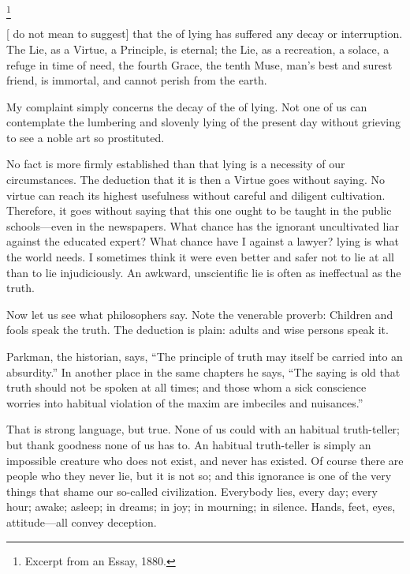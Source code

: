 \documentclass[../../demo.tex]{novelettesubdoc}
\begin{document}
\begin{upperpage}
\null
{}
\footnote{Excerpt from an Essay, 1880.}
\end{upperpage}

[ do not mean to suggest] that the  of lying has
suffered any decay or interruption. The Lie, as a Virtue, a
Principle, is eternal; the Lie, as a recreation, a solace, a refuge in
time of need, the fourth Grace, the tenth Muse, man's best and surest
friend, is immortal, and cannot perish from the earth.

My complaint simply concerns the decay of the  of lying.
Not one of us can contemplate the lumbering and slovenly lying of the
present day without grieving to see a noble art so prostituted.

No fact is more firmly established than that lying is a necessity of our
circumstances. The deduction that it is then a Virtue goes without
saying. No virtue can reach its highest usefulness without careful and
diligent cultivation. Therefore, it goes without saying that this one
ought to be taught in the public schools---even in the newspapers. What
chance has the ignorant uncultivated liar against the educated expert?
What chance have I against a lawyer?  lying
is what the world needs. I sometimes think it were even better and safer
not to lie at all than to lie injudiciously. An awkward, unscientific
lie is often as ineffectual as the truth.

Now let us see what philosophers say. Note the venerable proverb:
Children and fools  speak the truth. The deduction is plain:
adults and wise persons  speak it.

Parkman, the historian,
says, ``The principle of truth may itself be carried into an absurdity.''
In another place in the same chapters he says, ``The saying is old that
truth should not be spoken at all times; and those whom a sick
conscience worries into habitual violation of the maxim are imbeciles
and nuisances.''

That is strong language, but true.
None of us could  with an habitual truth-teller;
but thank goodness none of us has to. An habitual truth-teller is simply
an impossible creature who does not exist, and never has existed.
Of course there are people who  they
never lie, but it is not so; and this ignorance is one of the very
things that shame our so-called civilization. Everybody lies, every day;
every hour; awake; asleep; in dreams; in joy; in mourning; in silence.
Hands, feet, eyes, attitude---all convey deception.
\end{document}
